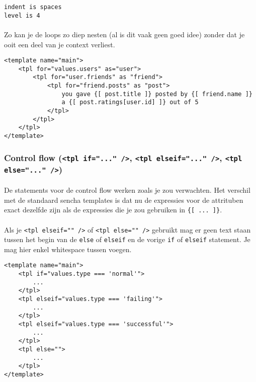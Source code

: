 \begin{lstlisting}
indent is spaces
level is 4
\end{lstlisting}

\paragraph {} Zo kan je de loops zo diep nesten (al is dit vaak geen goed idee) zonder dat
je ooit een deel van je context verliest.

\begin{lstlisting}
<template name="main">
	<tpl for="values.users" as="user">
		<tpl for="user.friends" as "friend">
			<tpl for="friend.posts" as "post">
				you gave {[ post.title ]} posted by {[ friend.name ]}
				a {[ post.ratings[user.id] ]} out of 5
			</tpl>
		</tpl>
	</tpl>
</template>
\end{lstlisting}


\subsubsection {Control flow (\lstinline{<tpl if="..." />},
	\lstinline{<tpl elseif="..." />}, \lstinline{<tpl else="..." />})}

\paragraph {} De statements voor de control flow werken zoals je zou verwachten. Het
verschil met de standaard sencha templates is dat nu de expressies voor de attrituben
exact dezelfde zijn als de expressies die je zou gebruiken in \lstinline|{[ ... ]}|.

\paragraph {}Als je \lstinline{<tpl elseif="" />} of \lstinline{<tpl else="" />} gebruikt
mag er geen text staan tussen het begin van de \lstinline{else} of \lstinline{elseif} en
de vorige \lstinline{if} of \lstinline{elseif} statement. Je mag hier enkel whitespace
tussen voegen.

\begin{lstlisting}
<template name="main">
	<tpl if="values.type === 'normal'">
		...
	</tpl>
	<tpl elseif="values.type === 'failing'">
		...
	</tpl>
	<tpl elseif="values.type === 'successful'">
		...
	</tpl>
	<tpl else="">
		...
	</tpl>
</template>
\end{lstlisting}

